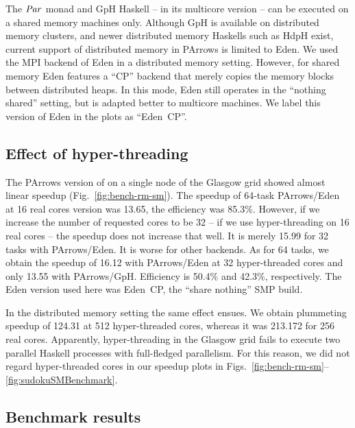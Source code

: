 The \ensuremath{\Conid{Par}} monad and GpH Haskell -- in its multicore version \cite{Marlow2009} --  can be executed on a shared
memory machines only. Although GpH is available on distributed memory
clusters, and newer distributed memory Haskells such as HdpH exist,
current support of distributed memory in PArrows is limited to
Eden. We used the MPI backend of Eden in a distributed memory
setting. However, for shared memory Eden features a ``CP'' backend
that merely copies the memory blocks between distributed heaps. In
this mode, Eden still operates in the ``nothing shared'' setting, but
is adapted better to multicore machines. We label this version of Eden
in the plots as ``Eden~CP''.



\subsection{Effect of hyper-threading}

The PArrows version of \rmtest on a single node of the Glasgow grid
showed almost linear speedup (Fig.~\ref{fig:bench-rm-sm}). The speedup
of 64-task PArrows/Eden at 16 real cores version was 13.65, the
efficiency was 85.3\%. However, if we increase the number of
requested cores to be 32 -- \ie if we use hyper-threading on 16 real
cores -- the speedup does not increase that well. It is merely 15.99
for 32 tasks with PArrows/Eden. It is worse for other backends.  As
for 64 tasks, we obtain the speedup of 16.12 with PArrows/Eden at 32
hyper-threaded cores and only 13.55 with PArrows/GpH. Efficiency is 50.4\% and 42.3\%, respectively. The Eden
version used here was Eden~CP, the \enquote{share nothing} SMP build.

In the distributed memory setting the same effect ensues. We obtain
plummeting speedup of 124.31 at 512 hyper-threaded cores, whereas it was
213.172 for 256 real cores. Apparently, hyper-threading in the Glasgow
grid fails to execute two parallel Haskell processes with full-fledged
parallelism. For this reason, we did not regard hyper-threaded cores in
our speedup plots in Figs.~\ref{fig:bench-rm-sm}--\ref{fig:sudokuSMBenchmark}.




\subsection{Benchmark results}

